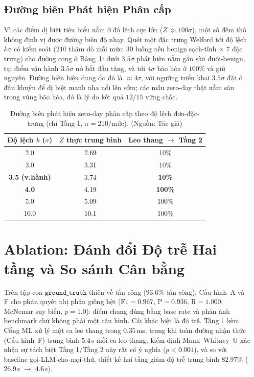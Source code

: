 \subsection{Đường biên Phát hiện Phân cấp}
Vì các điểm dị biệt tiêu biểu nằm ở độ lệch cực lớn ($Z\!\gg\!100\sigma$), một số đếm thô không định vị được đường biên độ nhạy. Quét một đặc trưng Welford tới độ lệch $k\sigma$ có kiểm soát ($210$ thăm dò mỗi mức: $30$ luồng nền benign sạch-tĩnh $\times$ $7$ đặc trưng) cho đường cong ở Bảng~\ref{tab:zeroday_graded}: dưới $3.5\sigma$ phát hiện nằm gần sàn đuôi-benign, tại điểm vận hành $3.5\sigma$ nó bắt đầu tăng, và tới $4\sigma$ bão hòa ở $100\%$ và giữ nguyên. Đường biên hiệu dụng do đó là $\approx\!4\sigma$, với ngưỡng triển khai $3.5\sigma$ đặt ở đầu khuỷu để dị biệt manh nha nổi lên sớm; các mẫu zero-day thật nằm sâu trong vùng bão hòa, đó là lý do kết quả $12/15$ vững chắc.

\begin{table}[!htbp]
    \centering \footnotesize \setlength{\tabcolsep}{6pt}
    \caption{Đường biên phát hiện zero-day phân cấp theo độ lệch đơn-đặc-trưng (chỉ Tầng 1, $n=210$/mức). (Nguồn: Tác giả)}
    \label{tab:zeroday_graded}
    \begin{tabular}{|c|c|c|}
        \hline
        \textbf{Độ lệch $k$ ($\sigma$)} & \textbf{$Z$ thực trung bình} & \textbf{Leo thang $\rightarrow$ Tầng 2} \\ \hline
        2.0 & 2.69 & 10\% \\ \hline
        3.0 & 3.31 & 10\% \\ \hline
        \textbf{3.5 (v.hành)} & 3.74 & \textbf{10\%} \\ \hline
        \textbf{4.0} & 4.19 & \textbf{100\%} \\ \hline
        5.0 & 5.09 & 100\% \\ \hline
        10.0 & 10.1 & 100\% \\ \hline
    \end{tabular}
\end{table}

\section{Ablation: Đánh đổi Độ trễ Hai tầng và So sánh Cân bằng}
\label{sec:balanced}
Trên tập con $\texttt{ground\_truth}$ thiên về tấn công ($93.6\%$ tấn công), Cấu hình~A và F cho phán quyết nhị phân giống hệt ($\mathrm{F1}=0.967$, $\mathrm{P}=0.936$, $\mathrm{R}=1.000$; McNemar suy biến, $p=1.0$): điểm chung đúng bằng base rate và phản ánh benchmark chứ không phải một cấu hình. Cái khác biệt là độ trễ. Tầng 1 kèm Cổng ML xử lý một ca leo thang trong $0.35$\,ms, trong khi toàn đường nhận thức (Cấu hình~F) trung bình $5.4$\,s mỗi ca leo thang; kiểm định Mann--Whitney~U xác nhận sự tách biệt Tầng 1/Tầng 2 này rất có ý nghĩa ($p<0.001$), và so với baseline gọi-LLM-cho-mọi-thứ, thiết kế hai tầng giảm độ trễ trung bình $82.97\%$ ($26.9$\,s $\rightarrow$ $4.6$\,s).

